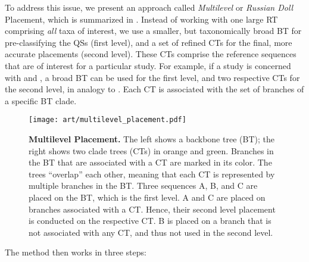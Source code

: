 
To address this issue, we present an approach called \emph{Multilevel} or \emph{Russian Doll} Placement,
which is summarized in .
Instead of working with one large \ac{RT} comprising {\em all} taxa of interest,
we use a smaller, but taxonomically broad \ac{BT} for pre-classifying the \acp{QS} (first level),
and a set of refined \acp{CT} for the final, more accurate placements (second level).
These \acp{CT} comprise the reference sequences that are of interest for a particular study.
For example, if a study is concerned with  and ,
a broad  \ac{BT} can be used for the first level,
and two respective \acp{CT} for the second level, in analogy to \citep{Mahe2017}.
Each \ac{CT} is associated with the set of branches of a specific \ac{BT} clade.

\begin{figure}[hpbt]
    \centering
    \texttt{[image: art/multilevel\_placement.pdf]}
    \caption[Multilevel Placement]{
        \textbf{Multilevel Placement.}
        The left shows a backbone tree (BT); the right shows two clade trees (CTs) in orange and green.
        Branches in the BT that are associated with a CT are marked in its color.
        The trees ``overlap'' each other, meaning that each CT is represented by multiple branches in the BT.
        Three sequences {\sffamily A}, {\sffamily B}, and {\sffamily C} are placed on the BT, which is the first level.
        {\sffamily A} and {\sffamily C} are placed on branches associated with a CT.
        Hence, their second level placement is conducted on the respective CT.
        {\sffamily B} is placed on a branch that is not associated with any CT,
        and thus not used in the second level.
    }
    \label{fig:multilevel_placement}
\end{figure}

The method then works in three steps:

